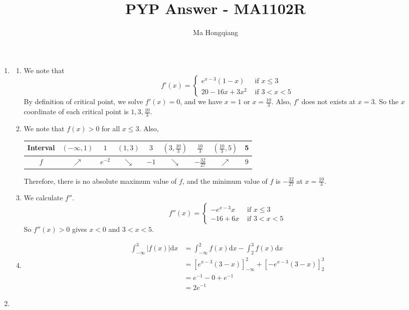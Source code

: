 \documentclass[12pt]{article}
\newcommand{\diff}{\mathrm{d}}
\theoremstyle{definition}
\begin{document}
\title{PYP Answer - MA1102R}
\author{Ma Hongqiang}
\maketitle
\begin{enumerate}
  \item\begin{enumerate}
    \item We note that 
    \[
f'(x)=\begin{cases}
e^{x-3}(1-x)&\text{ if }x\leq 3\\
20 - 16 x + 3 x^2&\text{ if }3<x<5
\end{cases}
    \]
    By definition of critical point, we solve $f'(x)=0$, and we have $x=1$ or $x=\frac{10}{3}$. Also, $f'$ does not exists at $x=3$. So the $x$ coordinate of each critical point is $1,3,\frac{10}{3}$.
    \item We note that $f(x)>0$ for all $x\leq 3$. Also,
    \begin{table}[h]
    \centering
    \begin{tabular}{|c|c|c|c|c|c|c|c|c|}
Interval&$(-\infty, 1)$&$1$&$(1,3)$&$3$&$(3,\frac{10}{3})$&$\frac{10}{3}$&$(\frac{10}{3},5)$&5\\\hline
$f$&$\nearrow$&$e^{-2}$&$\searrow$&$-1$&$\searrow$&$-\frac{32}{27}$&$\nearrow$&9\\
\end{tabular}
\end{table}
Therefore, there is no absolute maximum value of $f$, and the minimum value of $f$ is $-\frac{32}{27}$ at $x=\frac{10}{3}$.
    \item We calculate $f''$.
    \[
f''(x)=\begin{cases}
-e^{x-3}x&\text{ if }x\leq 3\\
-16 + 6 x&\text{ if }3<x<5
\end{cases}
    \]
    So $f''(x)>0$ gives $x<0$ and $3<x<5$.
    \item 
    \begin{align*}
    \int_{-\infty}^3|f(x)|\diff x &=\int_{-\infty}^2f(x)\diff x-\int_2^3f(x)\diff x\\
    &=[e^{x-3}(3-x)]^2_{-\infty}+[-e^{x-3}(3-x)]_2^3\\
    &=e^{-1}-0+e^{-1}\\
    &=2e^{-1}
    \end{align*}
  \end{enumerate}
  \item\begin{enumerate}

\end{enumerate}
\end{enumerate}
\end{document}

